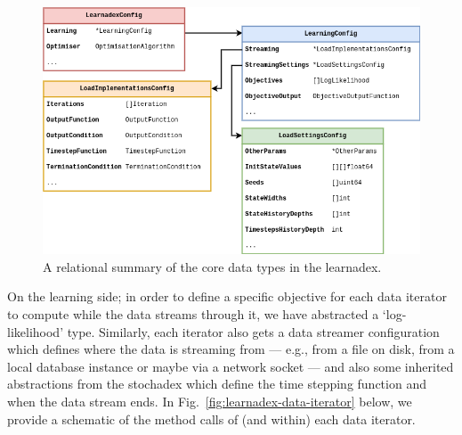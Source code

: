 \begin{figure}[h]
\centering
\includegraphics[width=12cm]{images/chapter-3-learnadex-data-types.drawio.png}
\caption{A relational summary of the core data types in the learnadex.}
\label{fig:learnadex-data-types-design}
\end{figure}

On the learning side; in order to define a specific objective for each data iterator to compute while the data streams through it, we have abstracted a `log-likelihood' type. Similarly, each iterator also gets a data streamer configuration which defines where the data is streaming from --- e.g., from a file on disk, from a local database instance or maybe via a network socket --- and also some inherited abstractions from the stochadex which define the time stepping function and when the data stream ends. In Fig.~\ref{fig:learnadex-data-iterator} below, we provide a schematic of the method calls of (and within) each data iterator.

